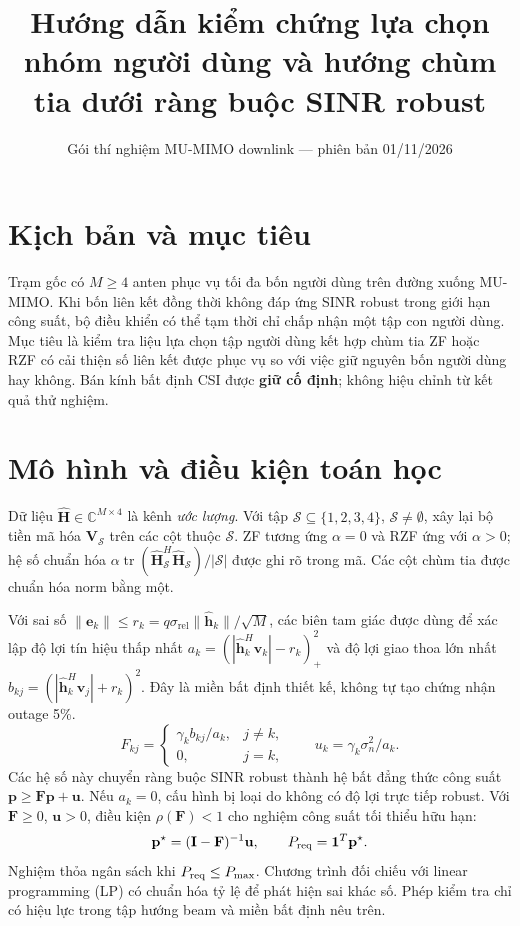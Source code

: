 \documentclass[12pt,onecolumn]{IEEEtran}
\title{Hướng dẫn kiểm chứng lựa chọn nhóm người dùng và hướng chùm tia dưới ràng buộc SINR robust}
\author{Gói thí nghiệm MU-MIMO downlink — phiên bản 01/11/2026}
\begin{document}
\maketitle
\section{Kịch bản và mục tiêu}
Trạm gốc có $M\ge4$ anten phục vụ tối đa bốn người dùng trên đường xuống MU-MIMO. Khi bốn liên kết đồng thời không đáp ứng SINR robust trong giới hạn công suất, bộ điều khiển có thể tạm thời chỉ chấp nhận một tập con người dùng. Mục tiêu là kiểm tra liệu lựa chọn tập người dùng kết hợp chùm tia ZF hoặc RZF có cải thiện số liên kết được phục vụ so với việc giữ nguyên bốn người dùng hay không. Bán kính bất định CSI được \textbf{giữ cố định}; không hiệu chỉnh từ kết quả thử nghiệm.

\section{Mô hình và điều kiện toán học}
Dữ liệu $\widehat{\mathbf H}\in\mathbb C^{M\times4}$ là kênh \emph{ước lượng}. Với tập $\mathcal S\subseteq\{1,2,3,4\}$, $\mathcal S\ne\emptyset$, xây lại bộ tiền mã hóa $\mathbf V_{\mathcal S}$ trên các cột thuộc $\mathcal S$. ZF tương ứng $\alpha=0$ và RZF ứng với $\alpha>0$; hệ số chuẩn hóa $\alpha\operatorname{tr}(\widehat{\mathbf H}_{\mathcal S}^{H}\widehat{\mathbf H}_{\mathcal S})/|\mathcal S|$ được ghi rõ trong mã. Các cột chùm tia được chuẩn hóa norm bằng một.

Với sai số $\|\mathbf e_k\|\le r_k=q\sigma_{\mathrm{rel}}\|\widehat{\mathbf h}_k\|/\sqrt M$, các biên tam giác được dùng để xác lập độ lợi tín hiệu thấp nhất $a_k=(|\widehat{\mathbf h}_k^H\mathbf v_k|-r_k)_+^2$ và độ lợi giao thoa lớn nhất $b_{kj}=(|\widehat{\mathbf h}_k^H\mathbf v_j|+r_k)^2$. Đây là miền bất định thiết kế, không tự tạo chứng nhận outage 5\%.
\begin{equation}
F_{kj}=\begin{cases}\gamma_k b_{kj}/a_k,&j\ne k,\\0,&j=k,\end{cases}\qquad u_k=\gamma_k\sigma_n^2/a_k.
\end{equation}
Các hệ số này chuyển ràng buộc SINR robust thành hệ bất đẳng thức công suất $\mathbf p\ge\mathbf F\mathbf p+\mathbf u$. Nếu $a_k=0$, cấu hình bị loại do không có độ lợi trực tiếp robust. Với $\mathbf F\ge0$, $\mathbf u>0$, điều kiện $\rho(\mathbf F)<1$ cho nghiệm công suất tối thiểu hữu hạn:
\begin{equation}
\mathbf p^\star=(\mathbf I-\mathbf F)^{-1}\mathbf u,\qquad P_{\rm req}=\mathbf1^T\mathbf p^\star.
\end{equation}
Nghiệm thỏa ngân sách khi $P_{\rm req}\le P_{\max}$. Chương trình đối chiếu với linear programming (LP) có chuẩn hóa tỷ lệ để phát hiện sai khác số. Phép kiểm tra chỉ có hiệu lực trong tập hướng beam và miền bất định nêu trên.
\end{document}

